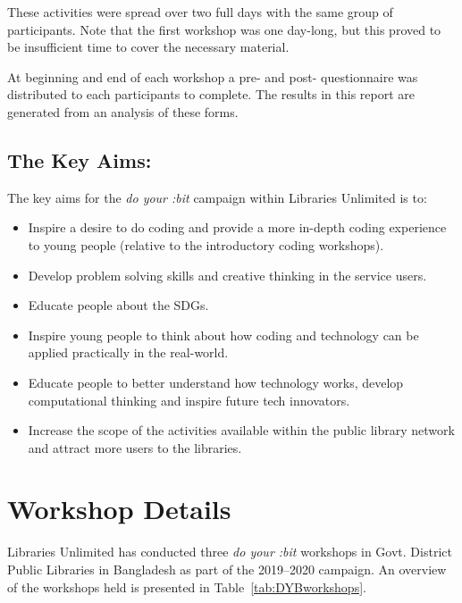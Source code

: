 \documentclass[12pt]{report} %
\newcommand{\DYB}{\textit{do your :bit }}
\begin{document}
These activities were spread over two full days with the same group of participants. Note that the first workshop was one day-long, but this proved to be insufficient time to cover the necessary material. 

At beginning and end of each workshop a pre- and post- questionnaire was distributed to each participants to complete. The results in this report are generated from an analysis of these forms.



\subsection{The Key Aims:}

The key aims for the \DYB campaign within Libraries Unlimited is to:
\begin{itemize}
\item Inspire a desire to do coding and provide a more in-depth coding experience to young people (relative to the introductory coding workshops).
\item Develop problem solving skills and creative thinking in the service users.
\item Educate people about the SDGs.
\item Inspire young people to think about how coding and technology can be applied practically in the real-world.
\item Educate people to better understand how technology works, develop computational thinking and inspire future tech innovators.
\item Increase the scope of the activities available within the public library network and attract more users to the libraries.
\end{itemize}


\section{Workshop Details} %

Libraries Unlimited has conducted three \DYB workshops in Govt. District Public Libraries in Bangladesh as part of the 2019--2020 campaign. An overview of the workshops held is presented in Table~\ref{tab:DYBworkshops}.%
\end{document}
